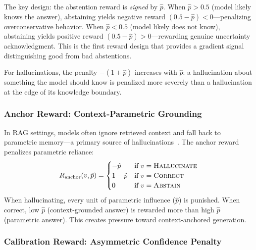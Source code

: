 \documentclass[11pt]{article}
\begin{document}
The key design: the abstention reward is \emph{signed} by $\hat{p}$. When $\hat{p} > 0.5$ (model likely knows the answer), abstaining yields negative reward $(0.5 - \hat{p}) < 0$---penalizing overconservative behavior. When $\hat{p} < 0.5$ (model likely does not know), abstaining yields positive reward $(0.5 - \hat{p}) > 0$---rewarding genuine uncertainty acknowledgment. This is the first reward design that provides a gradient signal distinguishing good from bad abstentions.

For hallucinations, the penalty $-(1 + \hat{p})$ increases with $\hat{p}$: a hallucination about something the model should know is penalized more severely than a hallucination at the edge of its knowledge boundary.

\subsubsection{Anchor Reward: Context-Parametric Grounding}
\label{sec:anchor}

In RAG settings, models often ignore retrieved context and fall back to parametric memory---a primary source of hallucinations~\cite{lewis2020rag}. The anchor reward penalizes parametric reliance:
\begin{equation}
R_{\text{anchor}}(v, \hat{p}) = \begin{cases}
-\hat{p} & \text{if } v = \textsc{Hallucinate} \\
1 - \hat{p} & \text{if } v = \textsc{Correct} \\
0 & \text{if } v = \textsc{Abstain}
\end{cases}
\label{eq:anchor}
\end{equation}
When hallucinating, every unit of parametric influence ($\hat{p}$) is punished. When correct, low $\hat{p}$ (context-grounded answer) is rewarded more than high $\hat{p}$ (parametric answer). This creates pressure toward context-anchored generation.

\subsubsection{Calibration Reward: Asymmetric Confidence Penalty}
\label{sec:calib}
\end{document}
